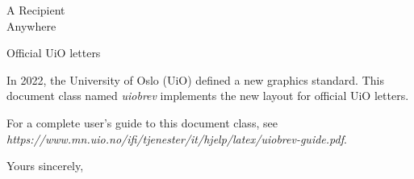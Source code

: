 \documentclass[UKenglish, 11pt]{uiobrev}
\begin{document}
\begin{letter}{A Recipient\\ Anywhere}

  \opening{Official UiO letters}

  In 2022, the University of Oslo (UiO) defined a new graphics
  standard. This document class named \emph{uiobrev} implements
  the new layout for official UiO letters.

  \bigskip
  For a complete user's guide to this document class, see
  \textsf{\emph{https://www.mn.uio.no/ifi/tjenester/it/hjelp/latex/uiobrev-guide.pdf}}.

  \closing{Yours sincerely,}
\end{letter}
\end{document}
